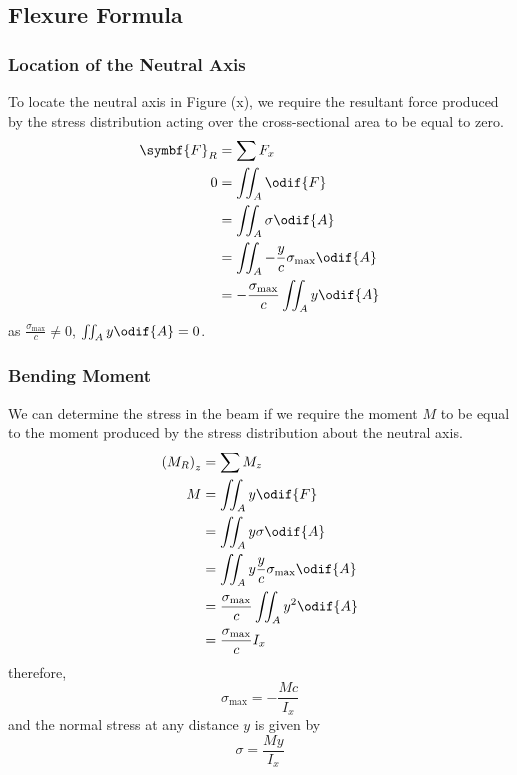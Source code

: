 \documentclass{article}
\begin{document}
\subsection{Flexure Formula}
\subsubsection{Location of the Neutral Axis}
To locate the neutral axis in Figure (x), we require the resultant force produced by the stress distribution
acting over the cross-sectional area to be equal to zero.
\begin{align*}
    \symbf{F}_R & = \sum F_x                                           \\
    0           & = \iint_A \odif{F}                                   \\
                & = \iint_A \sigma \odif{A}                            \\
                & = \iint_A -\frac{y}{c} \sigma_{\text{max}} \odif{A}  \\
                & = - \frac{\sigma_{\text{max}}}{c} \iint_A y \odif{A}
\end{align*}
as \(\frac{\sigma_{\text{max}}}{c} \neq 0\), \(\iint_A y \odif{A} = 0\).
\subsubsection{Bending Moment}
We can determine the stress in the beam if we
require the moment \(M\) to be equal to the moment produced by the stress
distribution about the neutral axis.
\begin{align*}
    \left( M_R \right)_z & = \sum M_z                                             \\
    M                    & = \iint_A y \odif{F}                                   \\
                         & = \iint_A y \sigma \odif{A}                            \\
                         & = \iint_A y \frac{y}{c} \sigma_{\text{max}} \odif{A}  \\
                         & = \frac{\sigma_{\text{max}}}{c} \iint_A y^2 \odif{A} \\
                         & = \frac{\sigma_{\text{max}}}{c} I_x 
\end{align*}
therefore, 
\begin{equation*}
    \sigma_{\text{max}} = -\frac{M c}{I_x}
\end{equation*}
and the normal stress at any distance \(y\) is given by
\begin{equation*}
    \sigma = \frac{M y}{I_x}
\end{equation*}
\end{document}
